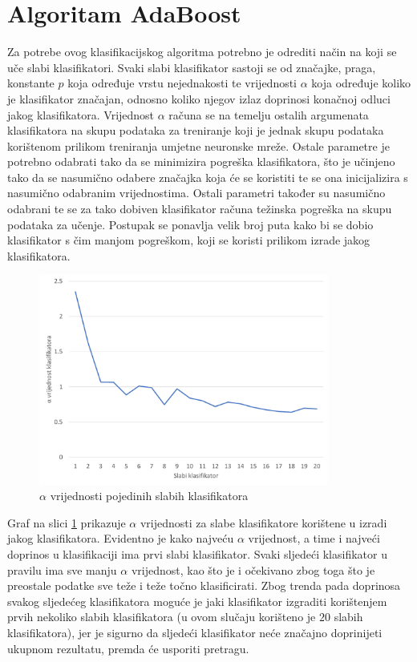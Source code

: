 \documentclass[times, utf8, zavrsni, numeric]{fer}
\begin{document}
\section{Algoritam AdaBoost}
Za potrebe ovog klasifikacijskog algoritma potrebno je odrediti način na koji se uče slabi klasifikatori.
Svaki slabi klasifikator sastoji se od značajke, praga, konstante $p$ koja određuje vrstu nejednakosti te vrijednosti $\alpha$ koja određuje koliko je klasifikator značajan, odnosno koliko njegov izlaz doprinosi konačnoj odluci jakog klasifikatora.
Vrijednost $\alpha$ računa se na temelju ostalih argumenata klasifikatora na skupu podataka za treniranje koji je jednak skupu podataka korištenom prilikom treniranja umjetne neuronske mreže.
Ostale parametre je potrebno odabrati tako da se minimizira pogreška klasifikatora, što je učinjeno tako da se nasumično odabere značajka koja će se koristiti te se ona inicijalizira s nasumično odabranim vrijednostima.
Ostali parametri također su nasumično odabrani te se za tako dobiven klasifikator računa težinska pogreška na skupu podataka za učenje.
Postupak se ponavlja velik broj puta kako bi se dobio klasifikator s čim manjom pogreškom, koji se koristi prilikom izrade jakog klasifikatora.\\
\begin{figure}[ht!]
    \centering
    \includegraphics[width=0.85\textwidth]{Images/Ada.pdf}
    \captionsetup{justification=centering}
    \caption{$\alpha$ vrijednosti pojedinih slabih klasifikatora}
    \label{fig:ada}
\end{figure}

Graf na slici \ref{fig:ada} prikazuje $\alpha$ vrijednosti za slabe klasifikatore korištene u izradi jakog klasifikatora. 
Evidentno je kako najveću $\alpha$ vrijednost, a time i najveći doprinos u klasifikaciji ima prvi slabi klasifikator. 
Svaki sljedeći klasifikator u pravilu ima sve manju $\alpha$ vrijednost, kao što je i očekivano zbog toga što je preostale podatke sve teže i teže točno klasificirati. 
Zbog trenda pada doprinosa svakog sljedećeg klasifikatora moguće je jaki klasifikator izgraditi korištenjem prvih nekoliko slabih klasifikatora (u ovom slučaju korišteno je $20$ slabih klasifikatora), jer je sigurno da sljedeći klasifikator neće značajno doprinijeti ukupnom rezultatu, premda će usporiti pretragu.
\end{document}
